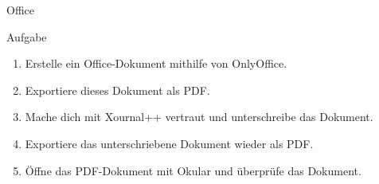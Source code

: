 \begin{frame}{Office}
    \vspace{0.5cm}
    \begin{alertblock}{Aufgabe}
        \begin{enumerate}
            \item Erstelle ein Office-Dokument mithilfe von OnlyOffice.\pause
            \item Exportiere dieses Dokument als PDF.\pause
            \item Mache dich mit Xournal++ vertraut und unterschreibe das Dokument.\pause
            \item Exportiere das unterschriebene Dokument wieder als PDF.\pause
            \item Öffne das PDF-Dokument mit Okular und überprüfe das Dokument.
        \end{enumerate}
    \end{alertblock}
\end{frame}